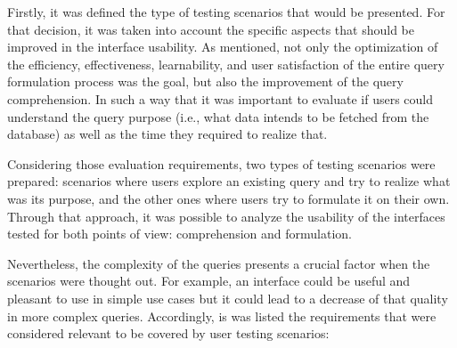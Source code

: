 Firstly, it was defined the type of testing scenarios that would be presented. For that decision, it was taken into account the specific aspects that should be improved in the interface usability. As mentioned, not only the optimization of the efficiency, effectiveness, learnability, and user satisfaction of the entire query formulation process was the goal, but also the improvement of the query comprehension. In such a way that it was important to evaluate if users could understand the query purpose (i.e., what data intends to be fetched from the database) as well as the time they required to realize that.

Considering those evaluation requirements, two types of testing scenarios were prepared: scenarios where users explore an existing query and try to realize what was its purpose, and the other ones where users try to formulate it on their own. Through that approach, it was possible to analyze the usability of the interfaces tested for both points of view: comprehension and formulation.

Nevertheless, the complexity of the queries presents a crucial factor when the scenarios were thought out. For example, an interface could be useful and pleasant to use in simple use cases but it could lead to a decrease of that quality in more complex queries. Accordingly, is was listed the requirements that were considered relevant to be covered by user testing scenarios:

